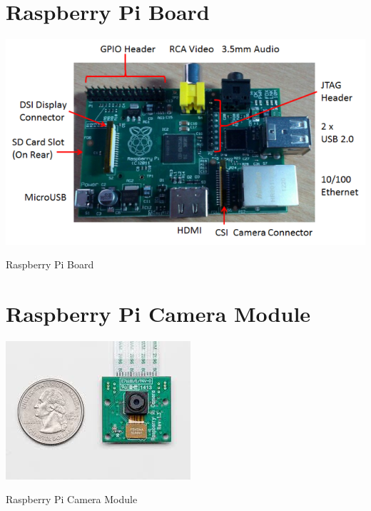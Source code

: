 \documentclass[12pt, a4paper]{article}
\begin{document}
\begin{appendices}
\section{Raspberry Pi Board}
\begin{appendixfig}
\centering
\includegraphics[scale=1.00]{RPiModelB.png}
\caption{Raspberry Pi Board}
\label{}
\end{appendixfig}

\newpage
\section{Raspberry Pi Camera Module}
\begin{appendixfig}
\centering
\includegraphics[scale=1.00]{index.jpeg}
\caption{Raspberry Pi Camera Module}
\label{}
\end{appendixfig}

\newpage

\end{appendices}
\end{document}
